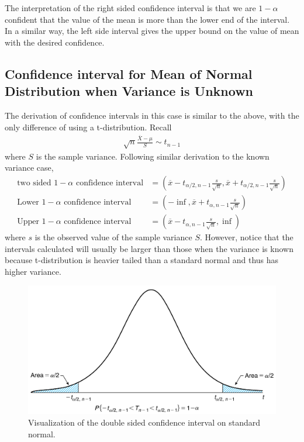 \documentclass[../probability-notes.tex]{subfiles}
\begin{document}
    The interpretation of the right sided confidence interval is that we are $1-\alpha$ confident that the value of the mean is more than the lower end of the interval. In a similar way, the left side interval gives the upper bound on the value of mean with the desired confidence.


    \subsection{Confidence interval for Mean of Normal Distribution when Variance is Unknown}
    The derivation of confidence intervals in this case is similar to the above, with the only difference of using a t-distribution. Recall
    \begin{align*}
        \sqrt{n} \frac{\overline{X} - \mu}{S} \sim t_{n-1}
    \end{align*}
    where $S$ is the sample variance. Following similar derivation to the known variance case,
    \begin{align*}
        \text{two sided $1 - \alpha$ confidence interval} &= (\overline{x}-t_{\alpha /2, n-1}\frac{s}{\sqrt{n}}, \overline{x}+t_{\alpha /2, n-1}\frac{s}{\sqrt{n}})\\
        \text{Lower $1-\alpha$ confidence interval} &= (-\inf, \overline{x} + t_{\alpha, n-1}\frac{s}{\sqrt{n}})\\
        \text{Upper $1-\alpha$ confidence interval} &= (\overline{x} - t_{\alpha, n-1}\frac{s}{\sqrt{n}}, \inf)
    \end{align*}
    where $s$ is the observed value of the sample variance $S$. However, notice that the intervals calculated will usually be larger than those when the variance is known because t-distribution is heavier tailed than a standard normal and thus has higher variance.

    \begin{figure}[h]
    \includegraphics[scale=0.3]{../images/conf_2}
    \centering
    \caption{Visualization of the double sided confidence interval on standard normal.}
    \label{fig:conf_2} %
    \end{figure}
\end{document}
